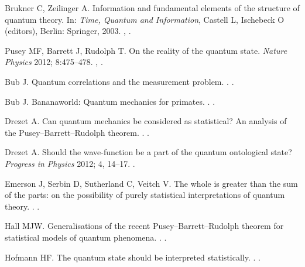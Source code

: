 \documentclass[DIV=calc,fontsize=12pt]{scrartcl} %
\theoremstyle{definition}
\theoremstyle{plain}
\begin{document}
\begin{thebibliography}{999}
Brukner C, Zeilinger A.
\newblock Information and fundamental elements of the structure of quantum theory.
\newblock In: \emph{Time, Quantum and Information}, Castell L, Ischebeck O (editors), Berlin: Springer, 2003.
\newblock \href {http://arxiv.org/abs/quant-ph/0212084}{},
\newblock \href {http://dx.doi.org/10.1007/978-3-662-10557-3_21}{}.

Pusey MF, Barrett J, Rudolph T.
\newblock On the reality of the quantum state.
\newblock \emph{Nature Physics} 2012; 8:475--478.
\newblock \href {http://arxiv.org/abs/1111.3328} {},
\href {http://dx.doi.org/10.1038/nphys2309} {}.

Bub J.
\newblock Quantum correlations and the measurement problem.
.
\newblock \href {http://arxiv.org/abs/1210.6371}
{}.

Bub J.
\newblock Bananaworld: Quantum mechanics for primates.
.
\newblock \href {http://arxiv.org/abs/1211.3062} {}.

Drezet A.
\newblock Can quantum mechanics be considered as statistical? An analysis of
the Pusey--Barrett--Rudolph theorem.
.
\newblock \href {http://arxiv.org/abs/1203.2475} {}.

Drezet A.
\newblock Should the wave-function be a part of the quantum ontological state?
\newblock \emph{Progress in Physics} 2012; 4, 14--17.
\newblock \href {http://arxiv.org/abs/1209.2565}{}.

Emerson J, Serbin D, Sutherland C, Veitch V.
\newblock The whole is greater than the sum of the parts: on the possibility of
purely statistical interpretations of quantum theory.
.
\newblock \href {http://arxiv.org/abs/1312.1345} {}.

Hall MJW.
\newblock Generalisations of the recent Pusey--Barrett--Rudolph theorem for
statistical models of quantum phenomena.
.
\newblock \href {http://arxiv.org/abs/1111.6304} {}.

Hofmann HF.
\newblock The quantum state should be interpreted statistically.
.
\newblock \href {http://arxiv.org/abs/1112.2446} {}.


\end{thebibliography}
\end{document}
